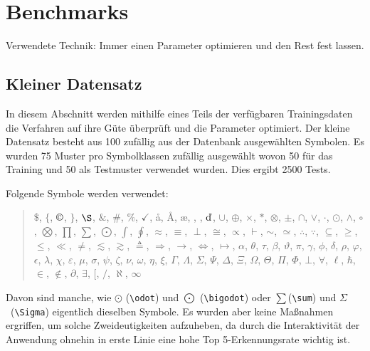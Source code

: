 \chapter{Benchmarks} %
\label{cha:benchmarks}

\TODO Verwendete Technik: Immer einen Parameter optimieren und den Rest fest lassen.

\section{Kleiner Datensatz}
\label{sec:kleiner_datensatz}

In diesem Abschnitt werden mithilfe eines Teils der verfügbaren Trainingsdaten die Verfahren auf ihre Güte überprüft und die Parameter optimiert. Der kleine Datensatz besteht aus 100 zufällig aus der Datenbank ausgewählten Symbolen.
Es wurden 75 Muster pro Symbolklassen zufällig ausgewählt wovon 50 für das Training und 50 als Testmuster verwendet wurden. Dies ergibt 2500 Tests.

Folgende Symbole werden verwendet:

\begin{quote}
$\$$,
$\{$,
$\copyright$,
$\}$,
$\S$,
$\&$,
$\#$,
$\%$,
$\checkmark$,
\aa,
\AA,
\ae,
\DH,
\DJ,
$\EUR$,
$\cup$,
$\oplus$,
$\times$,
$\ast$,
$\otimes$,
$\pm$,
$\cap$,
$\vee$,
$\cdot$,
$\odot$,
$\wedge$,
$\circ$,
$\bigotimes$,
$\prod$,
$\sum$,
$\bigodot$,
$\int$,
$\oint$,
$\approx$,
$\equiv$,
$\perp$,
$\cong$,
$\propto$,
$\vdash$,
$\sim$,
$\simeq$,
$\therefore$,
$\because$,
$\subseteq$,
$\geq$,
$\leq$,
$\ll$,
$\neq$,
$\lesssim$,
$\gtrsim$,
$\triangleq$,
$\Rightarrow$,
$\rightarrow$,
$\Leftrightarrow$,
$\mapsto$,
$\alpha$,
$\theta$,
$\tau$,
$\beta$,
$\vartheta$,
$\pi$,
$\gamma$,
$\phi$,
$\delta$,
$\rho$,
$\varphi$,
$\epsilon$,
$\lambda$,
$\chi$,
$\varepsilon$,
$\mu$,
$\sigma$,
$\psi$,
$\zeta$,
$\nu$,
$\omega$,
$\eta$,
$\xi$,
$\Gamma$,
$\Lambda$,
$\Sigma$,
$\Psi$,
$\Delta$,
$\Xi$,
$\Omega$,
$\Theta$,
$\Pi$,
$\Phi$,
$\bot$,
$\forall$,
$\ell$,
$\hbar$,
$\in$,
$\not\in$,
$\partial$,
$\exists$,
$[$,
$/$,
$\aleph$,
$\infty$
\end{quote}

Davon sind manche, wie $\odot$ (\verb!\odot!) und $\bigodot$ (\verb!\bigodot!) oder $\sum$(\verb!\sum!) und $\Sigma$~(\verb!\Sigma!) eigentlich dieselben Symbole. Es wurden aber keine Maßnahmen ergriffen, um solche Zweideutigkeiten aufzuheben, da durch die Interaktivität der Anwendung ohnehin in erste Linie eine hohe Top 5-Erkennungsrate wichtig ist.

